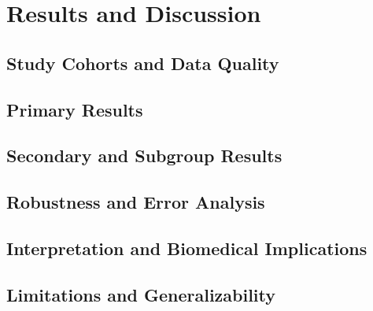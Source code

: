 \chapter{Results and Discussion}
\label{ch:results-discussion}

\section{Study Cohorts and Data Quality}

\section{Primary Results}

\section{Secondary and Subgroup Results}

\section{Robustness and Error Analysis}

\section{Interpretation and Biomedical Implications}

\section{Limitations and Generalizability}
